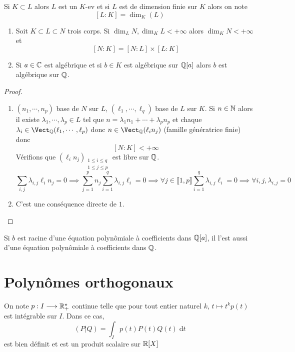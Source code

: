 \begin{dfn}
Si $K\subset L$ alors $L$ est un $K$-ev et si $L$ est de dimension finie sur $K$ alors on note \[
    [L:K]=\dim_K(L)
\]
\end{dfn}

\begin{prop}
\begin{enumerate}
    \item Soit $K\subset L\subset N$ trois corps. Si $\dim_L N, \dim_K L<+\infty$ alors $\dim_K N<+\infty$ et \[
        [N:K]=[N:L]\times [L:K]
    \]
    \item Si $a\in\mathbb C$ est algébrique et si $b\in K$ est algébrique sur $\mathbb Q[a]$ alors $b$ est algébrique sur $\mathbb Q$.
\end{enumerate}
\end{prop}

\begin{proof} ~
\begin{enumerate}
    \item $(n_1, \cdots, n_p)$ base de $N$ sur $L$, $(\ell_1, \cdots, \ell_q)$ base de $L$ sur $K$. Si $n\in\mathbb N$ alors il existe $\lambda_1, \cdots, \lambda_p\in L$ tel que $n=\lambda_1n_1+\cdots+\lambda_p n_p$ et chaque $\lambda_i\in\Vect_{\Q}(\ell_1, \cdots, \ell_p)$ donc $n\in\Vect_{\Q}(\ell_in_j)$ (famille génératrice finie) donc \[
        [N:K]<+\infty
    \]
    Vérifions que $(\ell_in_j)_{\substack{1\leq i\leq q\\ 1\leq j\leq p}}$ est libre sur $\mathbb Q$. \[
        \sum_{i, j}\lambda_{i, j}\ell_in_j=0\implies \sum_{j=1}^pn_j\sum_{i=1}^q\lambda_{i, j}\ell_i=0 \implies \forall j\in\llbracket 1, p\rrbracket \sum_{i=1}^q\lambda_{i, j}\ell_i=0\implies \forall i, j, \lambda_{i, j}=0
    \]
    \item C'est une conséquence directe de $1.$
\end{enumerate}
\end{proof}

\begin{rem}
Si $b$ est racine d'une équation polynômiale à coefficients dans $\mathbb Q[a]$, il l'est aussi d'une équation polynômiale à coefficients dans $\mathbb Q$.
\end{rem}

\section{Polynômes orthogonaux}

On note $p: I\longrightarrow \mathbb R_+^\star$ continue telle que pour tout entier naturel $k$, $t\longmapsto t^kp(t)$ est intégrable sur $I$. Dans ce cas, \[
    (P|Q)=\int_Ip(t)P(t)Q(t)\;\mathrm dt
\]
est bien définit et est un produit scalaire sur $\mathbb R[X]$

